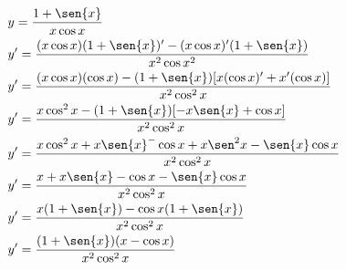 \begin{ex}
\begin{align}
&y=\frac{1+\sen{x}}{x\cos{x}}\nonumber\\
&y'=\frac{(x\cos{x})(1+\sen{x})'-(x\cos{x})'(1+\sen{x})}{x^2\cos{x}^2}\nonumber\\
&y'=\frac{(x\cos{x})(\cos{x})-(1+\sen{x})[x(\cos{x})'+x'(\cos{x})]}{x^2\cos^2{x}}\nonumber\\
&y'=\frac{x\cos^2{x}-(1+\sen{x})[-x\sen{x}+\cos{x}]}{x^2\cos^2{x}}\nonumber\\
&y'=\frac{x\cos^2{x}+x\sen{x}^-\cos{x}+x\sen^2{x}-\sen{x}\cos{x}}{x^2\cos^2{x}}\nonumber\\
&y'=\frac{x+x\sen{x}-\cos{x}-\sen{x}\cos{x}}{x^2\cos^2{x}}\nonumber\\
&y'=\frac{x(1+\sen{x})-\cos{x}(1+\sen{x})}{x^2\cos^2{x}}\nonumber\\
&y'=\frac{(1+\sen{x})(x-\cos{x})}{x^2\cos^2{x}}\nonumber
\end{align}
\end{ex}
